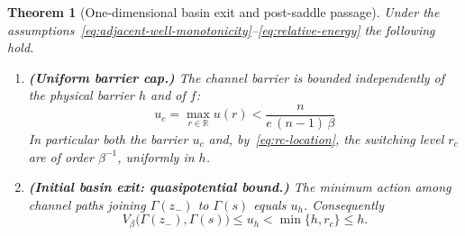 \documentclass{article}
\theoremstyle{plain}
\newtheorem{theorem}{Theorem}[section]
\theoremstyle{definition}
\theoremstyle{remark}
\newcommand{\R}{\mathbb{R}}
\begin{document}
\begin{theorem}[One-dimensional basin exit and post-saddle passage]
\label{thm:transition-time}
Under the assumptions~\eqref{eq:adjacent-well-monotonicity}--\eqref{eq:relative-energy} the following hold.
\begin{enumerate}
    \item \textbf{(Uniform barrier cap.)}
    The channel barrier is bounded independently of the physical barrier \(h\) and of \(f\):
    \begin{equation}
        \;u_c=\max_{r\in\R}u(r)<\frac{n}{e\,(n-1)\,\beta}\;
        \label{eq:barrier-cap}
    \end{equation}
    In particular both the barrier \(u_c\) and, by~\eqref{eq:rc-location}, the switching level \(r_c\) are of order \(\beta^{-1}\), uniformly in \(h\).
 
    \item \textbf{(Initial basin exit: quasipotential bound.)}
    The minimum action among channel paths joining \(\Gamma(z_-)\) to \(\Gamma(s)\) equals \(u_h\). Consequently
    \begin{equation}
        V_\beta\bigl(\Gamma(z_-),\Gamma(s)\bigr)\le u_h<\min\{h,r_c\}\le h .
        \label{eq:initial-bound}
    \end{equation}
 

\end{enumerate}
\end{theorem}
\end{document}

